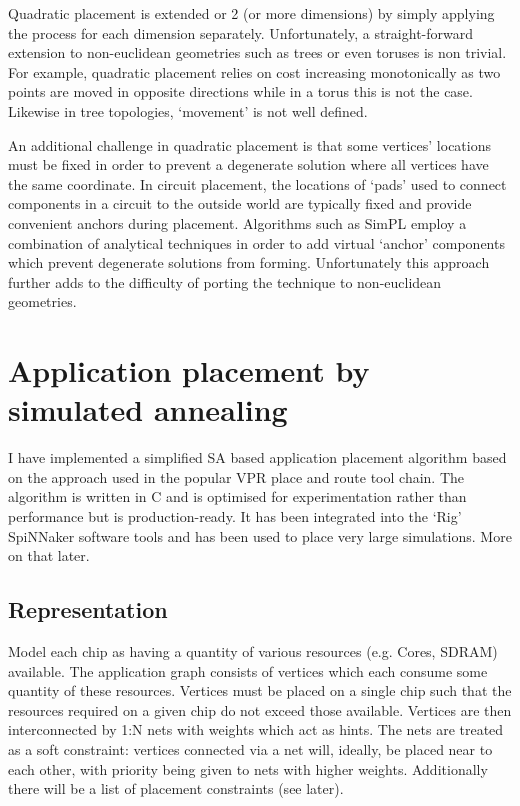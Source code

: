 				Quadratic placement is extended or 2 (or more dimensions) by simply
				applying the process for each dimension separately. Unfortunately, a
				straight-forward extension to non-euclidean geometries such as trees or
				even toruses is non trivial. For example, quadratic placement relies on
				cost increasing monotonically as two points are moved in opposite
				directions while in a torus this is not the case. Likewise in tree
				topologies, `movement' is not well defined.
				
				An additional challenge in quadratic placement is that some vertices'
				locations must be fixed in order to prevent a degenerate solution where
				all vertices have the same coordinate. In circuit placement, the
				locations of `pads' used to connect components in a circuit to the
				outside world are typically fixed and provide convenient anchors during
				placement. Algorithms such as SimPL \cite{kim12} employ a combination
				of analytical techniques in order to add virtual `anchor' components
				which prevent degenerate solutions from forming. Unfortunately this
				approach further adds to the difficulty of porting the technique to
				non-euclidean geometries.
				
	
	\section{Application placement by simulated annealing}
		
		\label{sec:placement-by-annealing}	
		
		I have implemented a simplified SA based application placement algorithm
		based on the approach used in the popular VPR place and route tool chain.
		The algorithm is written in C and is optimised for experimentation rather
		than performance but is production-ready. It has been integrated into the
		`Rig' SpiNNaker software tools and has been used to place very large
		simulations. More on that later.
		
		\subsection{Representation}
			
			Model each chip as having a quantity of various resources (e.g. Cores,
			SDRAM) available. The application graph consists of vertices which each
			consume some quantity of these resources. Vertices must be placed on a
			single chip such that the resources required on a given chip do not
			exceed those available. Vertices are then interconnected by 1:N nets with
			weights which act as hints. The nets are treated as a soft constraint:
			vertices connected via a net will, ideally, be placed near to each other,
			with priority being given to nets with higher weights. Additionally there
			will be a list of placement constraints (see later).
			
